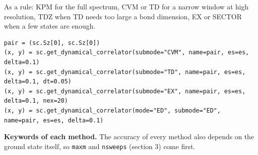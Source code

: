 \documentclass[11pt]{article}
\begin{document}
As a rule: KPM for the full spectrum, CVM or TD for a narrow window at
high resolution, TDZ when TD needs too large a bond dimension, EX or
SECTOR when a few states are enough.

\begin{lstlisting}
pair = (sc.Sz[0], sc.Sz[0])
(x, y) = sc.get_dynamical_correlator(submode="CVM", name=pair, es=es, delta=0.1)
(x, y) = sc.get_dynamical_correlator(submode="TD", name=pair, es=es, delta=0.1, dt=0.05)
(x, y) = sc.get_dynamical_correlator(submode="EX", name=pair, es=es, delta=0.1, nex=20)
(x, y) = sc.get_dynamical_correlator(mode="ED", submode="ED", name=pair, es=es, delta=0.1)
\end{lstlisting}

\textbf{Keywords of each method.} The accuracy of every method also depends on
the ground state itself, so \texttt{maxm} and \texttt{nsweeps} (section 3) come first.
\end{document}

